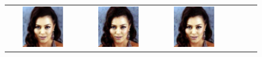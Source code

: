 \documentclass{article} %
\theoremstyle{definition}
\begin{document}
\begin{figure}[htp]
\begin{adjustbox}{max width=1.0\textwidth}
\begin{tabular}{cccccc}
\includegraphics[width=0.6\textwidth]{figures/celeba/good_init/gaussian_deblurring_FFT_d_flow_batch11_im0_pnsr30.77.pdf} & 
\includegraphics[width=0.6\textwidth]{figures/celeba/good_init/gaussian_deblurring_FFT_flow_priors_batch11_im0_pnsr30.47.pdf} &
\includegraphics[width=0.6\textwidth]{figures/celeba/good_init/gaussian_deblurring_FFT_pnp_flow_batch11_im0_pnsr33.76.pdf} \\

\end{tabular}
\end{adjustbox}
\end{figure}
\end{document}
